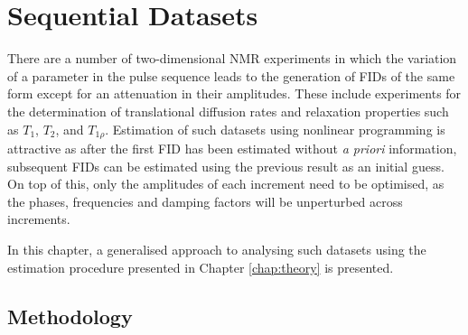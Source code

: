 \section{Sequential Datasets}
\label{sec}

There are a number of two-dimensional \ac{NMR} experiments in which the
variation of a parameter in the pulse sequence leads to the generation of
\acp{FID} of the same form except for an attenuation in their amplitudes. These
include experiments for the determination of translational diffusion rates and
relaxation properties such as $T_1$, $T_2$, and $T_{1\rho}$. Estimation of such
datasets using nonlinear programming is attractive as after the first \ac{FID}
has been estimated without \textit{a priori} information, subsequent \acp{FID}
can be estimated using the previous result as an initial guess. On top of this,
only the amplitudes of each increment need to be optimised, as the phases,
frequencies and damping factors will be unperturbed across increments.

In this chapter, a generalised approach to analysing such datasets using the
estimation procedure presented in Chapter \ref{chap:theory} is presented.

\subsection{Methodology}

